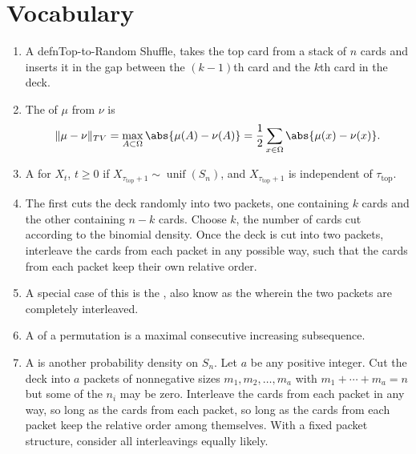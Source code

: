 \documentclass[12pt]{article}
\begin{document}
\hr

\section*{Vocabulary}
\begin{enumerate}
    \item
        A defn{Top-to-Random Shuffle},%
        takes the top card from a stack of \( n \) cards and inserts it
        in the gap between the \( (k-1) \)th card and the \( k \)th card
        in the deck.
    \item
        The  of \( \mu \) from \( \nu \)
        is%
        \[
            \| \mu - \nu \|_{TV} = \max_{A \subset \Omega} \abs{ \mu(A)
            - \nu(A)} = \frac{1}{2} \sum\limits_{x \in \Omega} \abs{ \mu
            (x) - \nu(x)}.
        \]
    \item
        A %
        for \( X_t \), \( t \ge 0 \) if \( X_{\tau_{\text{top}}+1} \sim
        \operatorname{unif}
        (S_n) \), and \( X_{\tau_{\text{top}}+1} \) is independent of \(
        \tau_{\text{top}} \).
    \item
        The  first cuts the deck randomly into two
        packets, one containing \( k \) cards and the other containing \(
        n-k \) cards.  Choose \( k \), the number of cards cut according
        to the binomial density.  Once the deck is cut into two packets,
        interleave the cards from each packet in any possible way, such
        that the cards from each packet keep their own relative order.
    \item
        A special case of this is the , also know
        as the  wherein the two packets are
        completely interleaved.
    \item
        A  of a permutation is a maximal
        consecutive increasing subsequence.
    \item
        A  is another probability density on \( S_n
        \).  Let \( a \) be any positive integer.  Cut the deck into \(
        a \) packets of nonnegative sizes \( m_1, m_2, \dots, m_a \)
        with \( m_1 + \cdots + m_a = n \) but some of the \( n_i \) may
        be zero.  Interleave the cards from each packet in any way, so
        long as the cards from each packet, so long as the cards from
        each packet keep the relative order among themselves.  With a
        fixed packet structure, consider all interleavings equally
        likely.
\end{enumerate}
\end{document}
